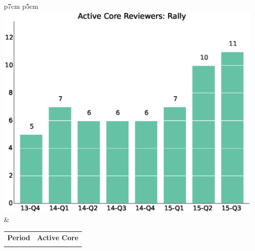 \documentclass[a4wide,11pt]{article}
\begin{document}
\begin{tabular}{p{7cm} p{5cm}}
    \vspace{0pt} 
    \includegraphics[scale=.35]{figs/active_core_scrRally.eps}
    & 
    \vspace{0pt}
    \begin{tabular}{l|l}%
    \bfseries Period & \bfseries Active Core %
    \csvreader[head to column names]{data/active_core_scrRally.csv}{}%
    {\\ & \activecorereviewers}
    \end{tabular}
\end{tabular}
\end{document}
